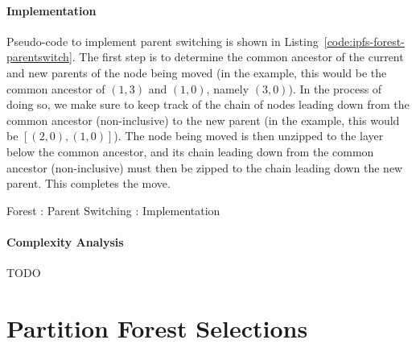 \paragraph{Implementation}

Pseudo-code to implement parent switching is shown in Listing~\ref{code:ipfs-forest-parentswitch}. The first step is to determine the common ancestor of the current and new parents of the node being moved (in the example, this would be the common ancestor of $(1,3)$ and $(1,0)$, namely $(3,0)$). In the process of doing so, we make sure to keep track of the chain of nodes leading down from the common ancestor (non-inclusive) to the new parent (in the example, this would be $[(2,0), (1,0)]$). The node being moved is then unzipped to the layer below the common ancestor, and its chain leading down from the common ancestor (non-inclusive) must then be zipped to the chain leading down the new parent. This completes the move.

\begin{stulisting}[p]
\caption{Forest : Parent Switching : Implementation}
\label{code:ipfs-forest-parentswitch}

\end{stulisting}

\paragraph{Complexity Analysis}

TODO

\afterpage{\clearpage}
\newpage

\section{Partition Forest Selections}
\label{sec:ipfs-selections}

